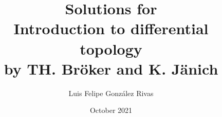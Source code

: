 \documentclass[12p]{report}
\begin{document}
\title{Solutions for \\ Introduction to differential topology \\ by TH. Bröker and K. Jänich}
\author{Luis Felipe González Rivas}
\date{October 2021}
\maketitle

\tableofcontents




\end{document}
